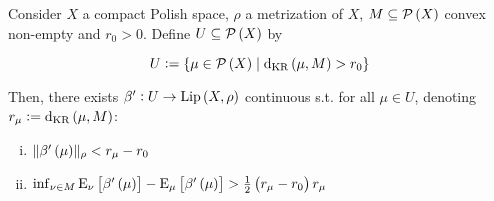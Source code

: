 \begin{samepage}
\begin{lemma}
\label{lmm:savvy_outside}

Consider $X$ a compact Polish space, $\rho$ a metrization of $X$, $M \subseteq \mathcal{P}\left(X\right)$ convex non-empty and $r_0 > 0$. Define $U \subseteq \mathcal{P}\left(X\right)$ by

\begin{equation*}
U := \{\mu \in \mathcal{P}\left(X\right) \mid \operatorname{d}_{\textnormal{KR}}\left(\mu,M\right) > r_0\}
\end{equation*}

Then, there exists $\beta': U \rightarrow {\operatorname{Lip}}\left(X,\rho\right)$ continuous s.t. for all $\mu \in U$, denoting $r_\mu:=\operatorname{d}_{\textnormal{KR}}\left(\mu,M\right)$:

\begin{enumerate}[i.]

\item $\lVert \beta'\left(\mu\right) \rVert_\rho < r_\mu - r_0$
\item $\inf_{\nu \in M} \operatorname{E}_\nu\left[\beta'\left(\mu\right)\right] - \operatorname{E}_\mu\left[\beta'\left(\mu\right)\right] > \frac{1}{2} \left(r_\mu - r_0\right) r_\mu$

\end{enumerate}

\end{lemma}
\end{samepage}

